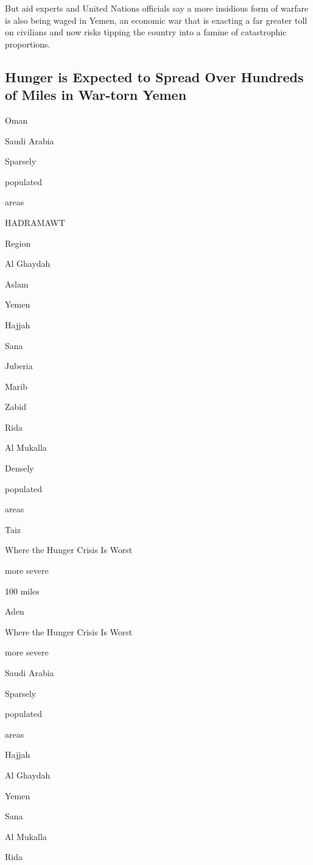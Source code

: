 But aid experts and United Nations officials say a more insidious form
of warfare is also being waged in Yemen, an economic war that is
exacting a far greater toll on civilians and now risks tipping the
country into a famine of catastrophic proportions.

\hypertarget{hunger-is-expected-to-spread-over-hundreds-of-miles-in-war-torn-yemen}{%
\subsection{Hunger is Expected to Spread Over Hundreds of Miles in
War-torn
Yemen}\label{hunger-is-expected-to-spread-over-hundreds-of-miles-in-war-torn-yemen}}

Oman

Saudi Arabia

Sparsely

populated

areas

HADRAMAWT

Region

Al Ghaydah

Aslam

Yemen

Hajjah

Sana

Juberia

Marib

Zabid

Rida

Al Mukalla

Densely

populated

areas

Taiz

Where the Hunger Crisis Is Worst

more severe

100 miles

Aden

Where the Hunger Crisis Is Worst

more severe

Saudi Arabia

Sparsely

populated

areas

Hajjah

Al Ghaydah

Yemen

Sana

Al Mukalla

Rida

